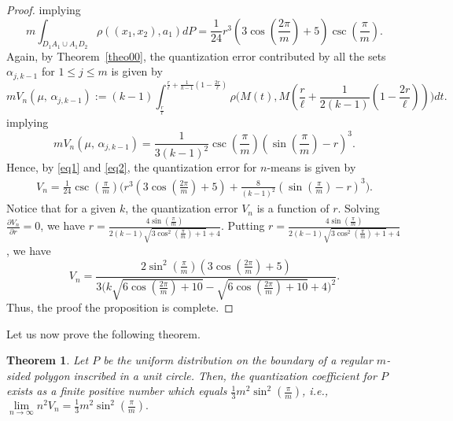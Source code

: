 \documentclass[12pt]{amsart}
\theoremstyle{plain}
\newtheorem{theorem}[subsection]{Theorem}
\theoremstyle{definition}
\newcommand{\uu}{\cup}%
\newcommand{\ga}{\alpha}
\newcommand{\pa}{\partial}
\begin{document}
\begin{proof}
implying
\begin{equation} \label{eq1}  m \int_{D_1A_1\uu A_1D_2}\rho((x_1, x_2), a_1) dP=\frac{1}{24} r^3 (3 \cos (\frac{2 \pi }{m})+5) \csc (\frac{\pi }{m}).
\end{equation}
Again, by Theorem~\ref{theo00}, the quantization error contributed by all the sets $\ga_{j, k-1}$ for $1\leq j\leq m$ is given by
\[m V_n(\mu, \, \ga_{j, k-1}):=(k-1)\int_{\frac {r}{\ell}}^{\frac {r}{\ell}+\frac {1}{k-1} (1-\frac{2r}{\ell})}\rho\Big(M(t), M(\frac {r}{\ell}+\frac {1}{2(k-1)} (1-\frac{2r}{\ell}))\Big) dt.\]
implying
\begin{equation} \label{eq2} m V_n(\mu, \, \ga_{j, k-1})=\frac 1{3(k-1)^2}\csc (\frac{\pi }{m}) (\sin (\frac{\pi }{m})-r)^3.
\end{equation}
Hence, by \eqref{eq1} and \eqref{eq2}, the quantization error for $n$-means is given by
\begin{align*}
V_n= \frac{1}{24} \csc (\frac{\pi }{m})\Big(r^3 (3 \cos(\frac{2 \pi }{m})+5)+\frac 8{(k-1)^2}(\sin(\frac{\pi }{m})-r)^3\Big).
\end{align*}
Notice that for a given $k$, the quantization error $V_n$ is a function of $r$. Solving $\frac{\pa V_n}{\pa r}=0$, we have $r=\frac{4 \sin (\frac{\pi }{m})}{2 (k-1) \sqrt{3 \cos ^2(\frac{\pi }{m})+1}+4}$. Putting $r=\frac{4 \sin (\frac{\pi }{m})}{2 (k-1) \sqrt{3 \cos ^2(\frac{\pi }{m})+1}+4}$, we have
\[V_n=\frac{2 \sin ^2(\frac{\pi }{m}) (3 \cos (\frac{2 \pi }{m})+5)}{3 \Big(k \sqrt{6 \cos (\frac{2 \pi }{m})+10}-\sqrt{6 \cos (\frac{2 \pi }{m})+10}+4\Big)^2}.\]
Thus, the proof the proposition is complete.
\end{proof}

Let us now prove the following theorem.

\begin{theorem}\label{theo01}
Let $P$ be the uniform distribution on the boundary of a regular $m$-sided polygon inscribed in a unit circle. Then, the quantization coefficient for $P$ exists as a finite positive number which equals $\frac{1}{3} m^2 \sin ^2(\frac{\pi }{m})$, i.e.,
$\lim\limits_{n\to \infty} n^2 V_n=\frac{1}{3} m^2 \sin ^2(\frac{\pi }{m}).$
\end{theorem}
\end{document}
